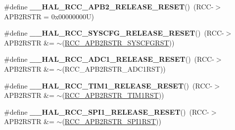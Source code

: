 \begin{DoxyCompactItemize}
\item 
\mbox{\label{group___r_c_c___a_p_b2___force___release___reset_gae1e413d623154942d5bbe89769161ece}} 
\#define {\bfseries \+\_\+\+\_\+\+H\+A\+L\+\_\+\+R\+C\+C\+\_\+\+A\+P\+B2\+\_\+\+R\+E\+L\+E\+A\+S\+E\+\_\+\+R\+E\+S\+ET}()~(R\+CC-\/$>$A\+P\+B2\+R\+S\+TR = 0x00000000\+U)
\item 
\mbox{\label{group___r_c_c___a_p_b2___force___release___reset_ga56de80d50f5ab276ebdeee16a0e2a31b}} 
\#define {\bfseries \+\_\+\+\_\+\+H\+A\+L\+\_\+\+R\+C\+C\+\_\+\+S\+Y\+S\+C\+F\+G\+\_\+\+R\+E\+L\+E\+A\+S\+E\+\_\+\+R\+E\+S\+ET}()~(R\+CC-\/$>$A\+P\+B2\+R\+S\+TR \&= $\sim$(\hyperlink{group___peripheral___registers___bits___definition_ga813d42b8d48ae6379c053a44870af49d}{R\+C\+C\+\_\+\+A\+P\+B2\+R\+S\+T\+R\+\_\+\+S\+Y\+S\+C\+F\+G\+R\+ST}))
\item 
\mbox{\label{group___r_c_c___a_p_b2___force___release___reset_ga681299b233339aa39a30fa5589cac5bc}} 
\#define {\bfseries \+\_\+\+\_\+\+H\+A\+L\+\_\+\+R\+C\+C\+\_\+\+A\+D\+C1\+\_\+\+R\+E\+L\+E\+A\+S\+E\+\_\+\+R\+E\+S\+ET}()~(R\+CC-\/$>$A\+P\+B2\+R\+S\+TR \&= $\sim$(R\+C\+C\+\_\+\+A\+P\+B2\+R\+S\+T\+R\+\_\+\+A\+D\+C1\+R\+ST))
\item 
\mbox{\label{group___r_c_c___a_p_b2___force___release___reset_ga1857f223177c9548ce1bae9753e0a7b4}} 
\#define {\bfseries \+\_\+\+\_\+\+H\+A\+L\+\_\+\+R\+C\+C\+\_\+\+T\+I\+M1\+\_\+\+R\+E\+L\+E\+A\+S\+E\+\_\+\+R\+E\+S\+ET}()~(R\+CC-\/$>$A\+P\+B2\+R\+S\+TR \&= $\sim$(\hyperlink{group___peripheral___registers___bits___definition_ga5bd060cbefaef05487963bbd6c48d7c6}{R\+C\+C\+\_\+\+A\+P\+B2\+R\+S\+T\+R\+\_\+\+T\+I\+M1\+R\+ST}))
\item 
\mbox{\label{group___r_c_c___a_p_b2___force___release___reset_gad7b4bc8c8a9146529a175c45eecf25e5}} 
\#define {\bfseries \+\_\+\+\_\+\+H\+A\+L\+\_\+\+R\+C\+C\+\_\+\+S\+P\+I1\+\_\+\+R\+E\+L\+E\+A\+S\+E\+\_\+\+R\+E\+S\+ET}()~(R\+CC-\/$>$A\+P\+B2\+R\+S\+TR \&= $\sim$(\hyperlink{group___peripheral___registers___bits___definition_ga345f05d3508a9fd5128208761feb29fb}{R\+C\+C\+\_\+\+A\+P\+B2\+R\+S\+T\+R\+\_\+\+S\+P\+I1\+R\+ST}))

\end{DoxyCompactItemize}
